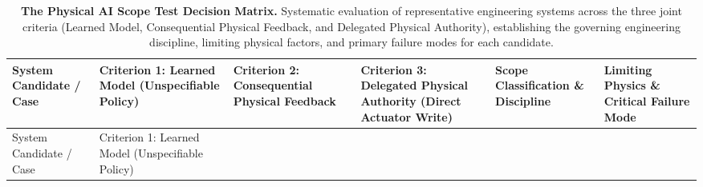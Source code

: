 \documentclass[
  10pt,
  letterpaper,
  twoside,
  openright,
  numbers=noenddot,
  headings=standardclasses
]{scrbook}
\begin{document}
\begin{longtable}[]{@{}
  >{\raggedright\arraybackslash}p{}
  >{\raggedright\arraybackslash}p{}
  >{\raggedright\arraybackslash}p{}
  >{\raggedright\arraybackslash}p{}
  >{\raggedright\arraybackslash}p{}
  >{\raggedright\arraybackslash}p{}@{}}
\caption{\textbf{The Physical AI Scope Test Decision Matrix.} Systematic
evaluation of representative engineering systems across the three joint
criteria (Learned Model, Consequential Physical Feedback, and Delegated
Physical Authority), establishing the governing engineering discipline,
limiting physical factors, and primary failure modes for each
candidate.}\label{tbl-01-scope-matrix}\tabularnewline
\toprule\noalign{}
\begin{minipage}[b]{\linewidth}\raggedright
System Candidate / Case
\end{minipage} & \begin{minipage}[b]{\linewidth}\raggedright
Criterion 1: Learned Model (Unspecifiable Policy)
\end{minipage} & \begin{minipage}[b]{\linewidth}\raggedright
Criterion 2: Consequential Physical Feedback
\end{minipage} & \begin{minipage}[b]{\linewidth}\raggedright
Criterion 3: Delegated Physical Authority (Direct Actuator Write)
\end{minipage} & \begin{minipage}[b]{\linewidth}\raggedright
Scope Classification \& Discipline
\end{minipage} & \begin{minipage}[b]{\linewidth}\raggedright
Limiting Physics \& Critical Failure Mode
\end{minipage} \\
\midrule\noalign{}
\endfirsthead
\toprule\noalign{}
\begin{minipage}[b]{\linewidth}\raggedright
System Candidate / Case
\end{minipage} & \begin{minipage}[b]{\linewidth}\raggedright
Criterion 1: Learned Model (Unspecifiable Policy)
\end{minipage} & \begin{minipage}[b]{\linewidth}\raggedright

\end{minipage}
\end{longtable}
\end{document}
